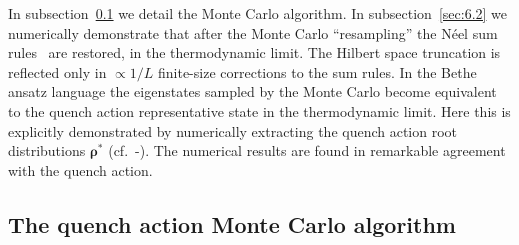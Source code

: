 \documentclass[11pt]{iopart}
\begin{document}
In subsection~\ref{sec:6.1} we detail the Monte Carlo algorithm. In 
subsection~\ref{sec:6.2} we numerically demonstrate that after the Monte Carlo 
``resampling'' the N\'eel sum rules~ are restored, in the 
thermodynamic limit. The Hilbert space truncation is reflected only in 
$\propto 1/L$ finite-size corrections to the sum rules. In the Bethe ansatz 
language the eigenstates sampled by the Monte Carlo become equivalent to the 
quench action representative state in the thermodynamic limit. Here this is 
explicitly demonstrated by numerically extracting the quench action root 
distributions $\pmb{\rho}^*$ (cf.~-). The 
numerical results are found in remarkable agreement with the quench action. 



\subsection{The quench action Monte Carlo algorithm}
\label{sec:6.1}
\end{document}
